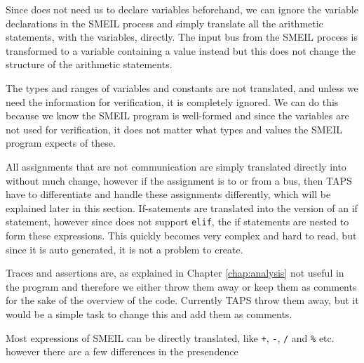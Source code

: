 Since \cspm{} does not need us to declare variables beforehand, we can ignore the variable declarations in the SMEIL process and simply translate all the arithmetic statements, with the variables, directly. The input bus from the SMEIL process is transformed to a variable containing a value instead but this does not change the structure of the arithmetic statements.

The types and ranges of variables and constants are not translated, and unless we need the information for verification, it is completely ignored. We can do this because we know the SMEIL program is well-formed and since the variables are not used for verification, it does not matter what types and values the SMEIL program expects of these.

All assignments that are not communication are simply translated directly into \cspm{} without much change, however if the assignment is to or from a bus, then TAPS have to differentiate and handle these assignments differently, which will be explained later in this section.
If-satements are translated into the \cspm{} version of an if statement, however since \cspm{} does not support \texttt{elif}, the if statements are nested to form these expressions. This quickly becomes very complex and hard to read, but since it is auto generated, it is not a problem to create.

Traces and assertions are, as explained in Chapter \ref{chap:analysis} not useful in the \cspm{} program and therefore we either throw them away or keep them as comments for the sake of the overview of the code. Currently TAPS throw them away, but it would be a simple task to change this and add them as comments.

Most expressions of SMEIL can be directly translated, like \texttt{+}, \texttt{-}, \texttt{/} and \texttt{\%} etc. however there are a few differences in the presendence



